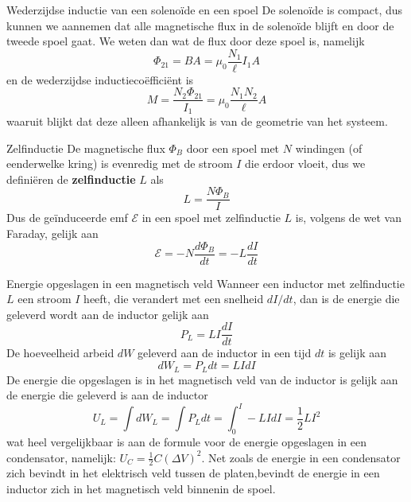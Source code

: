 \begin{app}{Wederzijdse inductie van een solenoïde en een spoel}
    De solenoïde is compact, dus kunnen we aannemen dat alle magnetische flux in de solenoïde blijft en door de tweede spoel gaat.
    We weten dan wat de flux door deze spoel is, namelijk
    \begin{equation*}
        \Phi_{21} = BA = \mu_{0}\dfrac{N_{1}}{\ell}I_{1}A
    \end{equation*}
    en de wederzijdse inductiecoëfficiënt is
    \begin{equation*}
        M = \dfrac{N_{2}\Phi_{21}}{I_{1}} = \mu_{0}\dfrac{N_{1}N_{2}}{\ell}A
    \end{equation*}
    waaruit blijkt dat deze alleen afhankelijk is van de geometrie van het systeem.
\end{app}


\begin{theo}[Zelfinductie]{Zelfinductie}
    De magnetische flux $\Phi_{B}$ door een spoel met $N$ windingen (of eenderwelke kring) is evenredig met de stroom $I$ die erdoor vloeit, dus we definiëren de \textbf{zelfinductie} $L$ als
    \begin{equation*}
        L = \dfrac{N\Phi_{B}}{I}
    \end{equation*}
    Dus de geïnduceerde emf $\mathcal{E}$ in een spoel met zelfinductie $L$ is, volgens de wet van Faraday, gelijk aan
    \begin{equation*}
        \mathcal{E} = -N\dfrac{d\Phi_{B}}{dt }= - L\dfrac{dI}{dt}
    \end{equation*}
    \vspace{-0.3cm}
\end{theo}

\newpage

\begin{app}{Energie opgeslagen in een magnetisch veld}
    Wanneer een inductor met zelfinductie $L$ een stroom $I$ heeft, die verandert met een snelheid $dI/dt$, dan is de energie die geleverd wordt aan de inductor gelijk aan 
    \begin{equation*}
        P_L = LI\dfrac{dI}{dt}
    \end{equation*}
    De hoeveelheid arbeid $dW$ geleverd aan de inductor in een tijd $dt$ is gelijk aan
    \begin{equation*}
        dW_L = P_Ldt = LIdI
    \end{equation*}
    De energie die opgeslagen is in het magnetisch veld van de inductor is gelijk aan de energie die geleverd is aan de inductor
    \begin{equation*}
        U_L = \int dW_L = \int P_Ldt = \int_{0}^{I} -LIdI = \dfrac{1}{2}LI^{2}
    \end{equation*}
    wat heel vergelijkbaar is aan de formule voor de energie opgeslagen in een condensator, namelijk: $U_{C} = \frac{1}{2}C(\Delta V)^{2}$. 
    Net zoals de energie in een condensator zich bevindt in het elektrisch veld tussen de platen,bevindt de energie in een inductor zich in het magnetisch veld binnenin de spoel.
\end{app}

